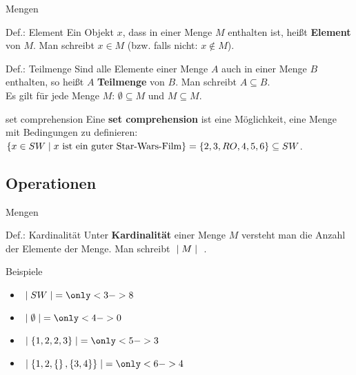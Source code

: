 	\begin{frame}{Mengen}
		\begin{block}{Def.: Element}
			Ein Objekt $x$, dass in einer Menge $M$ enthalten ist, heißt \textbf{Element} von $M$. Man schreibt $x \in M$ (bzw. falls nicht: $x \notin M$).			
		\end{block}

		\begin{block}{Def.: Teilmenge}
			Sind alle Elemente einer Menge $A$ auch in einer Menge $B$ enthalten, so heißt $A$ \textbf{Teilmenge} von $B$. Man schreibt $A \subseteq B$.\\
			Es gilt für jede Menge $M$: $\emptyset \subseteq M$ und $M \subseteq M$.
		\end{block}
		\pause
		\begin{block}{set comprehension}
			Eine \textbf{set comprehension} ist eine Möglichkeit, eine Menge mit Bedingungen zu definieren:\\
			$\left\{ x \in SW \mid x \text{ ist ein guter Star-Wars-Film} \right\} = \left\{ 2,3,RO,4,5,6 \right\} \subseteq SW$.
		\end{block}
	\end{frame}

\subsection{Operationen}
	\begin{frame}{Mengen}
		\begin{block}{Def.: Kardinalität}
			Unter \textbf{Kardinalität} einer Menge $M$ versteht man die Anzahl der Elemente der Menge. Man schreibt $\; \mid M \mid \;$ .
		\end{block}
		\pause
		\begin{exampleblock}{Beispiele}
			\begin{itemize}
				\item $\setsize{SW} = \only<3->{8}$
				\item $\setsize{\emptyset} = \only<4->{0}$
				\item $\setsize{\{1,2,2,3\}} = \only<5->{3}$
				\item $\setsize{\set{1, 2, \set{}, \set{3,4}}} = \only<6->{4}$
			\end{itemize}
		\end{exampleblock}
	\end{frame}

